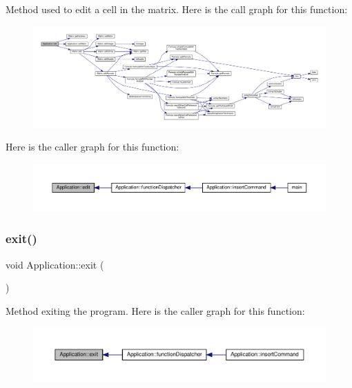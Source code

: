Method used to edit a cell in the matrix. Here is the call graph for this function\+:
\nopagebreak
\begin{figure}[H]
\begin{center}
\leavevmode
\includegraphics[width=350pt]{class_application_a4b193bf9c8be7105e89a2323ea77b1f4_cgraph}
\end{center}
\end{figure}
Here is the caller graph for this function\+:
\nopagebreak
\begin{figure}[H]
\begin{center}
\leavevmode
\includegraphics[width=350pt]{class_application_a4b193bf9c8be7105e89a2323ea77b1f4_icgraph}
\end{center}
\end{figure}
\mbox{\label{class_application_a3c8a98d6c10a5b054800488df16cdbcb}} 
\subsubsection{\texorpdfstring{exit()}{exit()}}
{\footnotesize\ttfamily void Application\+::exit (\begin{DoxyParamCaption}{ }\end{DoxyParamCaption})\hspace{0.3cm}{\ttfamily [private]}}

Method exiting the program. Here is the caller graph for this function\+:
\nopagebreak
\begin{figure}[H]
\begin{center}
\leavevmode
\includegraphics[width=350pt]{class_application_a3c8a98d6c10a5b054800488df16cdbcb_icgraph}
\end{center}
\end{figure}
\mbox{\label{class_application_a00241f0a09c32b0ef3cb1f068475cc50}} 
